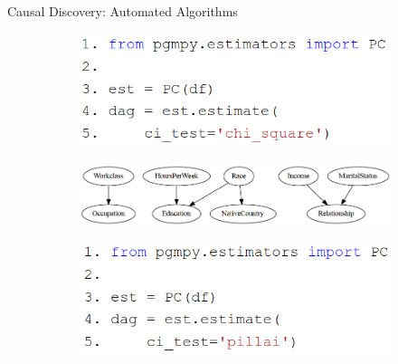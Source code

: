 \documentclass[aspectratio=169]{beamer}
\begin{document}
% 
% 

\begin{frame}{Causal Discovery: Automated Algorithms}
	\begin{figure}
		\begin{subfigure}{0.45\textwidth}
			\centering
			\includegraphics[scale=0.28]{imgs/pc_chisquare.png}
		\end{subfigure}%
		\begin{subfigure}{0.55 \textwidth}
			\centering
			\includegraphics[scale=0.25]{imgs/adult_x2.png}
		\end{subfigure}\vfill
		\begin{subfigure}{0.45 \textwidth}
			\centering
			\includegraphics[scale=0.28]{imgs/pc_pillai.png}
		\end{subfigure}%

\end{figure}
\end{frame}
\end{document}
